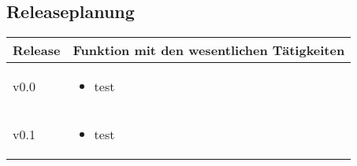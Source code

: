 \subsection{Releaseplanung}
\begin{table}[H]
\centering
\begin{tabular}{>{\centering\arraybackslash}m{} | m{} }
  \textbf{Release} & \textbf{Funktion mit den wesentlichen Tätigkeiten} \\
  \hline
  v0.0 & \begin{itemize}
    \item test
  \end{itemize} \\
  \hline
  v0.1 & \begin{itemize}
    \item test
  \end{itemize} \\
\end{tabular}
\end{table}
